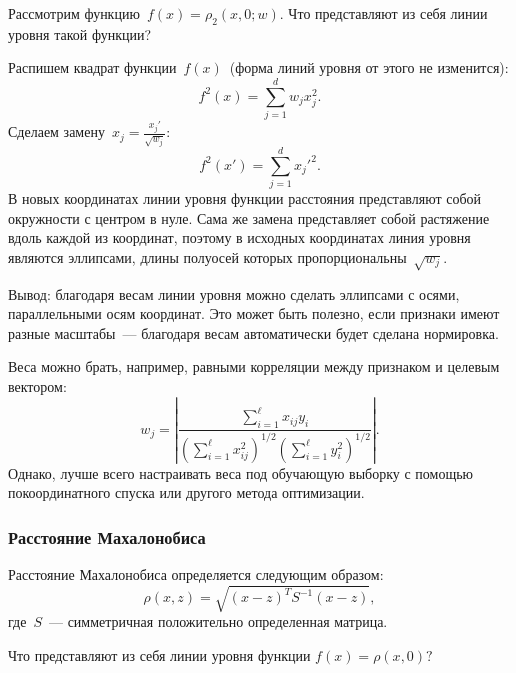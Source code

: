 \documentclass[12pt,fleqn]{article}
\begin{document}
        \begin{vkProblem}
            Рассмотрим функцию~$f(x) = \rho_2(x, 0; w)$.
            Что представляют из себя линии уровня такой функции?
        \end{vkProblem}

        \begin{esSolution}
            Распишем квадрат функции~$f(x)$~(форма линий уровня от этого не изменится):
            \[
                f^2(x) = \sum_{j = 1}^{d} w_j x_j^2.
            \]
            Сделаем замену~$x_j = \frac{x_j'}{\sqrt{w_j}}$:
            \[
                f^2(x') = \sum_{j = 1}^{d} {x_j'}^2.
            \]
            В новых координатах линии уровня функции расстояния представляют собой окружности с центром в нуле.
            Сама же замена представляет собой растяжение вдоль каждой из координат,
            поэтому в исходных координатах линия уровня являются эллипсами,
            длины полуосей которых пропорциональны~$\sqrt{w_j}$.
        \end{esSolution}

        Вывод: благодаря весам линии уровня можно сделать эллипсами с осями, параллельными осям координат.
        Это может быть полезно, если признаки имеют разные масштабы~--- благодаря весам автоматически
        будет сделана нормировка.

        Веса можно брать, например, равными корреляции
        между признаком и целевым вектором:
        \[
             w_j = \left|
             \frac{\sum_{i = 1}^{\ell} x_{ij} y_i}{\left(\sum_{i = 1}^{\ell} x_{ij}^2\right)^{1/2} \left(\sum_{i = 1}^{\ell} y_i^2\right)^{1/2}}
             \right|.
        \]
        Однако, лучше всего настраивать веса под обучающую выборку с помощью покоординатного
        спуска или другого метода оптимизации.

        \subsubsection{Расстояние Махалонобиса}
        Расстояние Махалонобиса определяется следующим образом:
        \[
            \rho(x, z) = \sqrt{(x - z)^T S^{-1} (x - z)},
        \]
        где~$S$~--- симметричная положительно определенная матрица.
        \vfill

        \begin{vkProblem}
        	Что представляют из себя линии уровня функции $f(x) = \rho(x, 0)?$
        \end{vkProblem}
        
\end{document}
